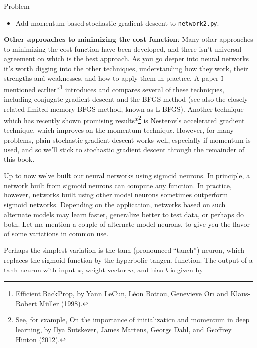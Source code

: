 \begin{exerciseBox}{Problem}


\begin{itemize}

\item Add momentum-based stochastic gradient descent to \texttt{network2.py}.

\end{itemize}


\textbf{Other approaches to minimizing the cost function:} Many other approaches to minimizing the cost function have been developed, and there isn't universal agreement on which is the best approach. As you go deeper into neural networks it's worth digging into the other techniques, understanding how they work, their strengths and weaknesses, and how to apply them in practice. A paper I mentioned earlier*\footnote{Efficient BackProp, by Yann LeCun, Léon Bottou, Genevieve Orr and Klaus-Robert Müller (1998).} introduces and compares several of these techniques, including conjugate gradient descent and the BFGS method (see also the closely related limited-memory BFGS method, known as L-BFGS). Another technique which has recently shown promising results*\footnote{See, for example, On the importance of initialization and momentum in deep learning, by Ilya Sutskever, James Martens, George Dahl, and Geoffrey Hinton (2012).} is Nesterov's accelerated gradient technique, which improves on the momentum technique. However, for many problems, plain stochastic gradient descent works well, especially if momentum is used, and so we'll stick to stochastic gradient descent through the remainder of this book.

\end{exerciseBox}





Up to now we've built our neural networks using sigmoid neurons. In principle, a network built from sigmoid neurons can compute any function. In practice, however, networks built using other model neurons sometimes outperform sigmoid networks. Depending on the application, networks based on such alternate models may learn faster, generalize better to test data, or perhaps do both. Let me mention a couple of alternate model neurons, to give you the flavor of some variations in common use.


Perhaps the simplest variation is the tanh (pronounced ``tanch'') neuron, which replaces the sigmoid function by the hyperbolic tangent function. The output of a tanh neuron with input $x$, weight vector $w$, and bias $b$ is given by

